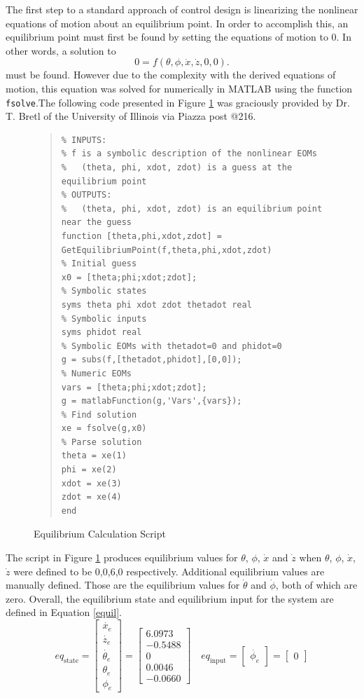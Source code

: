 \documentclass[12pt]{article}
\begin{document}
The first step to a standard approach of control design is linearizing the nonlinear equations of motion about an equilibrium point. In order to accomplish this, an equilibrium point must first be found by setting the equations of motion to 0. In other words, a solution to
\begin{equation*}
0 = f(\theta,\phi,\dot{x},\dot{z},0,0).
\end{equation*}
must be found. However due to the complexity with the derived equations of motion, this equation was solved for numerically in MATLAB using the function \lstinline|fsolve|.The following code presented in Figure \ref{fig:equill} was graciously provided by Dr. T. Bretl of the University of Illinois via Piazza post @216.
\begin{figure}[H]
\begin{quote}
\begin{lstlisting}
% INPUTS:
% f is a symbolic description of the nonlinear EOMs
%   (theta, phi, xdot, zdot) is a guess at the equilibrium point
% OUTPUTS:
%   (theta, phi, xdot, zdot) is an equilibrium point near the guess
function [theta,phi,xdot,zdot] = GetEquilibriumPoint(f,theta,phi,xdot,zdot)
% Initial guess
x0 = [theta;phi;xdot;zdot];
% Symbolic states
syms theta phi xdot zdot thetadot real
% Symbolic inputs
syms phidot real
% Symbolic EOMs with thetadot=0 and phidot=0
g = subs(f,[thetadot,phidot],[0,0]);
% Numeric EOMs
vars = [theta;phi;xdot;zdot];
g = matlabFunction(g,'Vars',{vars});
% Find solution
xe = fsolve(g,x0)
% Parse solution
theta = xe(1)
phi = xe(2)
xdot = xe(3)
zdot = xe(4)
end
\end{lstlisting}
\end{quote}
\caption{Equilibrium Calculation Script\label{fig:equill}}
\end{figure}
The script in Figure \ref{fig:equill} produces equilibrium values for $\theta$, $\phi$, $\dot{x}$ and $\dot{z}$ when $\theta$, $\phi$, $\dot{x}$, $\dot{z}$ were defined to be 0,0,6,0 respectively. Additional equilibrium values are manually defined. Those are the equilibrium values for $\dot{\theta}$ and $\dot{\phi}$, both of which are zero. Overall, the equilibrium state and equilibrium input for the system are defined in Equation \eqref{equil}.
\begin{equation}
\label{equil}
eq_{\textrm{state}} = 
\begin{bmatrix}
\dot{x_{e}} \\ \dot{z_{e}} \\ \dot{\theta_{e}} \\  \theta_{e} \\ \phi_{e}
\end{bmatrix}
=
\begin{bmatrix}
6.0973 \\ -0.5488 \\ 0 \\ 0.0046 \\ -0.0660
\end{bmatrix}
\quad
eq_{\textrm{input}} = 
\begin{bmatrix}
\dot{\phi_{e}}
\end{bmatrix}
=
\begin{bmatrix}
0
\end{bmatrix}
\end{equation}
\end{document}
